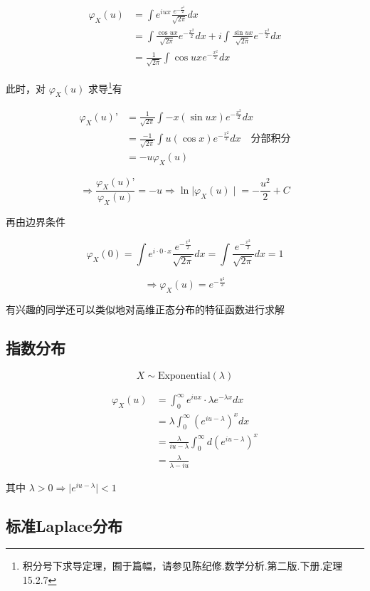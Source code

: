 \documentclass[a4paper, 11pt]{article} %
\begin{document}
\begin{align*}
\varphi_X(u) &= \int e^{iux}\frac{e^{-\frac{x^2}{2}}}{\sqrt{2\pi}}dx \\
&= \int\frac{\cos{ux}}{\sqrt{2\pi}}e^{-\frac{x^2}{2}}dx+i\int\frac{\sin{ux}}{\sqrt{2\pi}}e^{-\frac{x^2}{2}}dx \\
&= \frac{1}{\sqrt{2\pi}}\int\cos{ux}e^{-\frac{x^2}{2}}dx
\end{align*}

此时，对 $\varphi_X(u)$ 求导\footnote{积分号下求导定理，囿于篇幅，请参见陈纪修.数学分析.第二版.下册.定理15.2.7}有


\begin{align*}
\varphi_X(u)’ &= \frac{1}{\sqrt{2\pi}}\int-x(\sin{ux})e^{-\frac{x^2}{2}}dx \\
&= \frac{-1}{\sqrt{2\pi}}\int u(\cos{x})e^{-\frac{x^2}{2}}dx \quad \text{分部积分} \\
&= -u\varphi_X(u)
\end{align*}


$$
\Rightarrow \frac{\varphi_X(u)’}{\varphi_X(u)}=-u\Rightarrow \ln{\mid\varphi_X(u)\mid}=-\frac{u^2}{2}+C
$$

再由边界条件 

$$
\varphi_X(0)=\int e^{i\cdot0\cdot x}\frac{e^{-\frac{x^2}{2}}}{\sqrt{2\pi}}dx=\int\frac{e^{-\frac{x^2}{2}}}{\sqrt{2\pi}}dx=1
$$

$$
\Rightarrow \varphi_X(u)=e^{-\frac{u^2}{2}}
$$

有兴趣的同学还可以类似地对高维正态分布的特征函数进行求解

\subsection{指数分布}

$$
X\sim\text{Exponential}(\lambda)
$$

\begin{align*}
\varphi_X(u)&=\int_0^\infty e^{iux} \cdot \lambda e^{-\lambda x}dx\\ 
&=\lambda\int_0^\infty(e^{iu-\lambda})^xdx\\
&=\frac{\lambda}{iu-\lambda}\int_0^\infty d(e^{iu-\lambda})^x\\
&=\frac{\lambda}{\lambda-iu}
\end{align*}

其中 $\lambda>0\Rightarrow\mid e^{iu-\lambda}\mid<1$

\subsection{标准Laplace分布}
\end{document}
